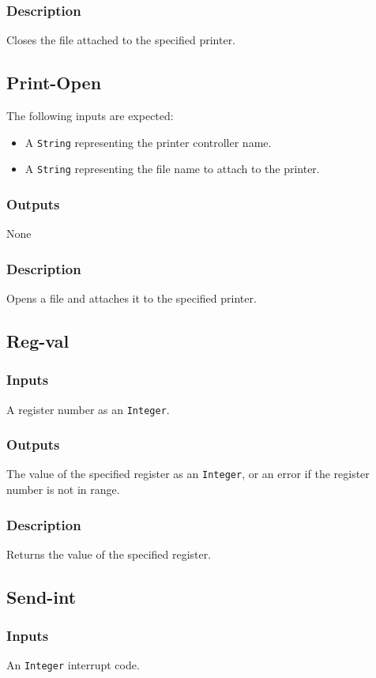 \documentclass[10pt, openany]{book}
\newcommand{\datatype}[1]{\texttt{#1}}
\begin{document}
\subsubsection{Description}
Closes the file attached to the specified printer.

\subsection{Print-Open}
The following inputs are expected:
\begin{itemize}
  \item A \datatype{String} representing the printer controller name.
  \item A \datatype{String} representing the file name to attach to the printer.
\end{itemize}
\subsubsection{Outputs}
None
\subsubsection{Description}
Opens a file and attaches it to the specified printer.

\subsection{Reg-val}
\subsubsection{Inputs}
A register number as an \datatype{Integer}.
\subsubsection{Outputs}
The value of the specified register as an \datatype{Integer}, or an error if the register number is not in range.
\subsubsection{Description}
Returns the value of the specified register.

\subsection{Send-int}
\subsubsection{Inputs}
An \datatype{Integer} interrupt code.
\end{document}

